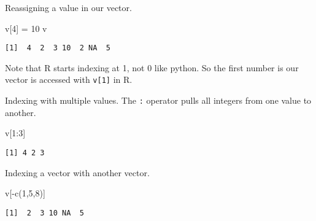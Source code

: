 \documentclass[
  letterpaper,
  DIV=11,
  numbers=noendperiod]{scrartcl}
\newenvironment{Shaded}{\begin{snugshade}}{\end{snugshade}}
\newcommand{\DecValTok}[1]{\textcolor[rgb]{0.68,0.00,0.00}{#1}}
\newcommand{\FunctionTok}[1]{\textcolor[rgb]{0.28,0.35,0.67}{#1}}
\newcommand{\NormalTok}[1]{\textcolor[rgb]{0.00,0.23,0.31}{#1}}
\newcommand{\OtherTok}[1]{\textcolor[rgb]{0.00,0.23,0.31}{#1}}
\newcommand{\SpecialCharTok}[1]{\textcolor[rgb]{0.37,0.37,0.37}{#1}}
\begin{document}
Reassigning a value in our vector.

\begin{Shaded}
\begin{Highlighting}[]
\NormalTok{v[}\DecValTok{4}\NormalTok{] }\OtherTok{=} \DecValTok{10}
\NormalTok{v}
\end{Highlighting}
\end{Shaded}

\begin{verbatim}
[1]  4  2  3 10  2 NA  5
\end{verbatim}

\begin{tcolorbox}[enhanced jigsaw, colbacktitle=quarto-callout-warning-color!10!white, title=\textcolor{quarto-callout-warning-color}{\faExclamationTriangle}\hspace{0.5em}{Python users!}, breakable, toprule=.15mm, coltitle=black, opacityback=0, bottomtitle=1mm, leftrule=.75mm, colframe=quarto-callout-warning-color-frame, bottomrule=.15mm, toptitle=1mm, arc=.35mm, titlerule=0mm, rightrule=.15mm, left=2mm, opacitybacktitle=0.6, colback=white]

Note that R starts indexing at 1, not 0 like python. So the first number
is our vector is accessed with \texttt{v{[}1{]}} in R.

\end{tcolorbox}

Indexing with multiple values. The \texttt{:} operator pulls all
integers from one value to another.

\begin{Shaded}
\begin{Highlighting}[]
\NormalTok{v[}\DecValTok{1}\SpecialCharTok{:}\DecValTok{3}\NormalTok{]}
\end{Highlighting}
\end{Shaded}

\begin{verbatim}
[1] 4 2 3
\end{verbatim}

Indexing a vector with another vector.

\begin{Shaded}
\begin{Highlighting}[]
\NormalTok{v[}\SpecialCharTok{{-}}\FunctionTok{c}\NormalTok{(}\DecValTok{1}\NormalTok{,}\DecValTok{5}\NormalTok{,}\DecValTok{8}\NormalTok{)]}
\end{Highlighting}
\end{Shaded}

\begin{verbatim}
[1]  2  3 10 NA  5
\end{verbatim}
\end{document}
